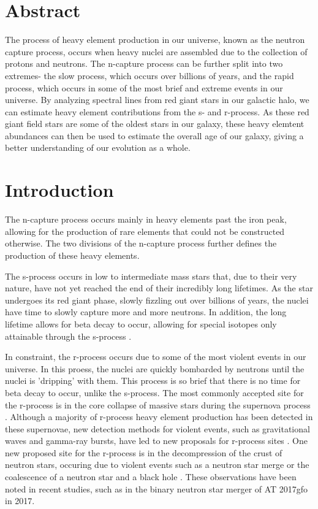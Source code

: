 \section{Abstract}

The process of heavy element production in our universe, known as the neutron capture process, occurs when heavy nuclei are assembled due to the collection of protons and neutrons. The n-capture process can be further split into two extremes- the slow process, which occurs over billions of years, and the rapid process, which occurs in some of the most brief and extreme events in our universe. By analyzing spectral lines from red giant stars in our galactic halo, we can estimate heavy element contributions from the s- and r-process. As these red giant field stars are some of the oldest stars in our galaxy, these heavy elemtent abundances can then be used to estimate the overall age of our galaxy, giving a better understanding of our evolution as a whole.

\section{Introduction}

The n-capture process occurs mainly in heavy elements past the iron peak, allowing for the production of rare elements that could not be constructed otherwise. The two divisions of the n-capture process further defines the production of these heavy elements.

The s-process occurs in low to intermediate mass stars that, due to their very nature, have not yet reached the end of their incredibly long lifetimes. As the star undergoes its red giant phase, slowly fizzling out over billions of years, the nuclei have time to slowly capture more and more neutrons. In addition, the long lifetime allows for beta decay to occur, allowing for special isotopes only attainable through the s-process \cite{ncs99}.

In constraint, the r-process occurs due to some of the most violent events in our universe. In this proess, the nuclei are quickly bombarded by neutrons until the nuclei is 'dripping' with them. This process is so brief that there is no time for beta decay to occur, unlike the s-process. The most commonly accepted site for the r-process is in the core collapse of massive stars during the supernova process \cite{ncs02}. Although a majority of r-process heavy element production has been detected in these supernovae, new detection methods for violent events, such as gravitational waves and gamma-ray bursts, have led to new proposals for r-process sites \cite{mmo17}. One new proposed site for the r-process is in the decompression of the crust of neutron stars, occuring due to violent events such as a neutron star merge or the coalescence of a neutron star and a black hole \cite{rpro07}. These observations have been noted in recent studies, such as in the binary neutron star merger of AT 2017gfo in 2017.

